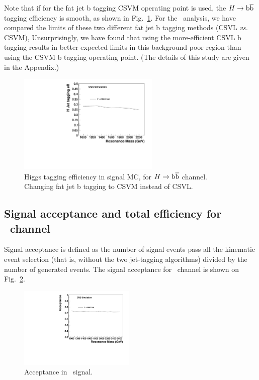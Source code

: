 Note that if for the fat jet b tagging CSVM operating point is used,
the $H\to\mathrm{b\overline{b}}$ tagging efficiency is smooth, as shown in
Fig.~\ref{fig:fatCSVM}.  For the \HbbZqq\ analysis, we have compared
the limits of these two different fat jet b tagging methods (CSVL 
{\it vs.} CSVM), Unsurprisingly, we have found that using the
more-efficient CSVL b tagging results in better expected limits in
this background-poor region than using the CSVM b tagging operating
point. (The details of this study are given in the Appendix.)



\begin{figure}[htb]
\begin{center}
\includegraphics[width=0.60\textwidth]{EXO-14-009/HbbZqqfigs/Signal/H-taggingEff-8TeV-CSVM.pdf}
\end{center}
\caption{
  Higgs tagging efficiency in signal MC, for $H\to\mathrm{b\overline{b}}$ channel.  
  Changing fat jet b tagging to CSVM instead of CSVL. 
}
\label{fig:fatCSVM}
\end{figure}

\clearpage

\subsection{Signal acceptance and total efficiency for \HbbZqq\ channel}

Signal acceptance is defined as the number of signal events pass all
the kinematic event selection (that is, without the two jet-tagging
algorithms) divided by the number of generated events.  The signal
acceptance for \HbbZqq\ channel is shown on Fig.~\ref{fig:Acc}.

\begin{figure}[htb]
\begin{center}
\includegraphics[width=0.49\textwidth]{EXO-14-009/HbbZqqfigs/Signal/HbbZqq-signal-acc-8TeV.pdf}
\end{center}
\caption{
Acceptance in \HbbZqq\ signal.
}
\label{fig:Acc}
\end{figure}

